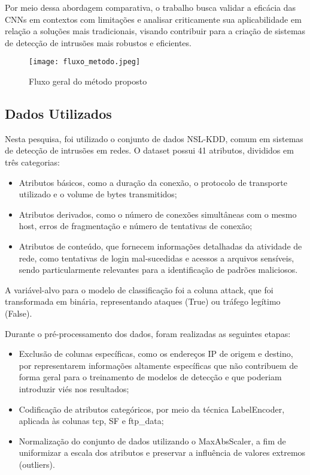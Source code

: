 \documentclass[conference]{IEEEtran}
\begin{document}
    Por meio dessa abordagem comparativa, o trabalho busca validar a eficácia das CNNs em contextos com limitações e analisar criticamente sua aplicabilidade em relação a soluções mais tradicionais, visando contribuir para a criação de sistemas de detecção de intrusões mais robustos e eficientes.
    
    \begin{figure}
        \centering
        \texttt{[image: fluxo\_metodo.jpeg]}
        \caption{Fluxo geral do método proposto }
        \label{fig:enter-label}
    \end{figure}

\subsection{Dados Utilizados}
      
    Nesta pesquisa, foi utilizado o conjunto de dados NSL-KDD, comum em sistemas de detecção de intrusões em redes. O dataset possui 41 atributos, divididos em três categorias: 

    \begin{itemize}
        \item Atributos básicos, como a duração da conexão, o protocolo de transporte utilizado e o volume de bytes transmitidos;
        \item Atributos derivados, como o número de conexões simultâneas com o mesmo host, erros de fragmentação e número de tentativas de conexão;
        \item Atributos de conteúdo, que fornecem informações detalhadas da atividade de rede, como tentativas de login mal-sucedidas e acessos a arquivos sensíveis, sendo particularmente relevantes para a identificação de padrões maliciosos.
    \end{itemize}
    
    A variável-alvo para o modelo de classificação foi a coluna attack, que foi transformada em binária, representando ataques (True) ou tráfego legítimo (False).

    Durante o pré-processamento dos dados, foram realizadas as seguintes etapas:

    \begin{itemize}
        \item Exclusão de colunas específicas, como os endereços IP de origem e destino, por representarem informações altamente específicas que não contribuem de forma geral para o treinamento de modelos de detecção e que poderiam introduzir viés nos resultados;
    \item Codificação de atributos categóricos, por meio da técnica LabelEncoder, aplicada às colunas tcp, SF e ftp\_data;
        \item Normalização do conjunto de dados utilizando o MaxAbsScaler, a fim de uniformizar a escala dos atributos e preservar a influência de valores extremos (outliers).
    \end{itemize}
    
\end{document}
